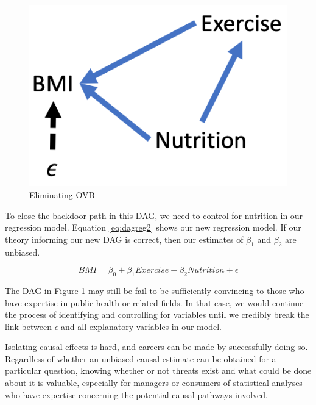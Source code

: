 \documentclass[
]{book}
\begin{document}
\begin{figure}

{\centering \includegraphics[width=\textwidth]{images/dag_regnut} 

}

\caption{Eliminating OVB}\label{fig:dagregnut}
\end{figure}

To close the backdoor path in this DAG, we need to control for nutrition in our regression model. Equation \eqref{eq:dagreg2} shows our new regression model. If our theory informing our new DAG is correct, then our estimates of \(\beta_1\) and \(\beta_2\) are unbiased.

\begin{equation}
BMI = \beta_0 + \beta_1Exercise + \beta_2Nutrition + \epsilon
\label{eq:dagreg2}
\end{equation}

The DAG in Figure \ref{fig:dagregnut} may still be fail to be sufficiently convincing to those who have expertise in public health or related fields. In that case, we would continue the process of identifying and controlling for variables until we credibly break the link between \(\epsilon\) and all explanatory variables in our model.

Isolating causal effects is hard, and careers can be made by successfully doing so. Regardless of whether an unbiased causal estimate can be obtained for a particular question, knowing whether or not threats exist and what could be done about it is valuable, especially for managers or consumers of statistical analyses who have expertise concerning the potential causal pathways involved.
\end{document}

